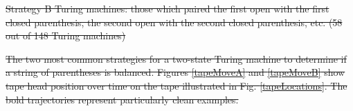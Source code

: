 \documentclass[12pt,twoside]{mitthesis}
\providecommand{\DIFdeltex}[1]{{\protect\color{red}\sout{#1}}}                      %
\providecommand{\DIFdelFL}[1]{\DIFdel{#1}} %
\providecommand{\DIFdel}[1]{\texorpdfstring{\DIFdeltex{#1}}{}} %
\begin{document}
{%
\DIFdelFL{Strategy B Turing machines: those which paired the first open with the first closed parenthesis, the second open with the second closed parenthesis, etc. (58 out of 148 Turing machines)}}


{%
\DIFdelFL{The two most common strategies for a two-state Turing machine to determine if a string of parentheses is balanced. Figures \ref{tapeMoveA} and \ref{tapeMoveB} show tape head position over time on the tape illustrated in Fig. \ref{tapeLocations}. The bold trajectories represent particularly clean examples.}}

\end{document}
